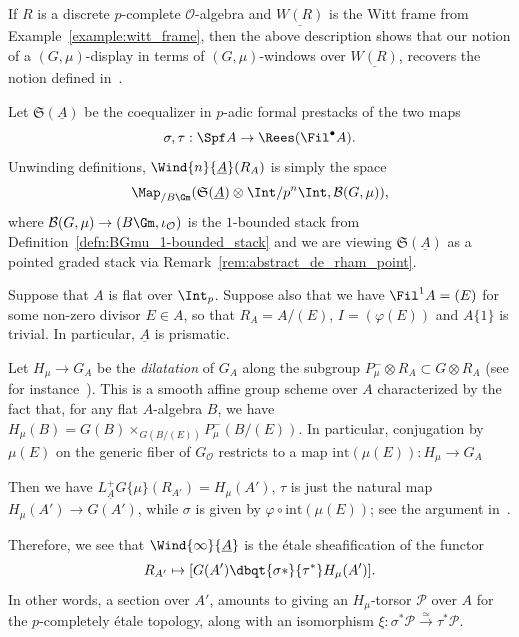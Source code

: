 \documentclass[10pt]{amsart}
\begin{document}
\begin{remark}
\label{rem:witt_frame_windows}
If $R$ is a discrete $p$-complete $\mathcal{O}$-algebra and $\underline{W(R)}$ is the Witt frame from Example~\ref{example:witt_frame}, then the above description shows that our notion of a $(G,\mu)$-display in terms of $(G,\mu)$-windows over $\underline{W(R)}$, recovers the notion defined in~\cite{MR4120808}.
\end{remark}   


\begin{remark}
\label{rem:B'Gmu_abstract}
Let $\mathfrak{S}(\underline{A})$ be the coequalizer in $p$-adic formal prestacks of the two maps
\[
\sigma,\tau:\Spf A \to \Rees(\Fil^\bullet A).
\]
Unwinding definitions, $\Wind{n}{\underline{A}}({R_A})$ is simply the space 
\[
\Map_{/B\Gm}(\mathfrak{S}(\underline{A})\otimes\Int/p^n\Int,\mathcal{B}(G,\mu)),
\]
where $\mathcal{B}(G,\mu)\to (B\Gm,\iota_{\mathcal{O}})$ is the $1$-bounded stack from Definition~\ref{defn:BGmu_1-bounded_stack} and we are viewing $\mathfrak{S}(\underline{A})$ as a pointed graded stack via Remark~\ref{rem:abstract_de_rham_point}.
\end{remark} 


\begin{remark}
\label{rem:dilatations}
Suppose that $A$ is flat over $\Int_p$. Suppose also that we have $\Fil^1A = (E)$ for some non-zero divisor $E\in A$, so that $R_A = A/(E)$, $I = (\varphi(E))$ and $A\{1\}$ is trivial. In particular, $\underline{A}$ is prismatic.

Let $H_{\mu}\to G_{A}$ be the \emph{dilatation} of $G_{A}$ along the subgroup $P^-_\mu\otimes R_A \subset G\otimes R_A$ (see for instance~\cite[\S 3.2]{blr}). This is a smooth affine group scheme over $A$ characterized by the fact that, for any flat $A$-algebra $B$, we have $H_\mu(B) = G(B)\times_{G(B/(E))}P^-_\mu(B/(E))$. In particular, conjugation by $\mu(E)$ on the generic fiber of $G_{\mathcal{O}}$ restricts to a map $\mathrm{int}(\mu(E)):H_\mu\to G_{A}$

Then we have $L^+_{\underline{A}}G\{\mu\}(R_{A'}) = H_\mu(A')$, $\tau$ is just the natural map $H_\mu(A')\to G(A')$, while $\sigma$ is given by $\varphi\circ \mathrm{int}(\mu(E))$; see the argument in~\cite[Lemma 5.2.1]{MR4355476}.

Therefore, we see that $\Wind{\infty}{\underline{A}}$ is the \'etale sheafification of the functor
\[
R_{A'}\mapsto [G(A')\dbqt{\sigma*}{\tau^*}H_\mu(A')].
\]
In other words, a section over $A'$, amounts to giving an $H_\mu$-torsor $\mathcal{P}$ over $A$ for the $p$-completely \'etale topology, along with an isomorphism $\xi:\sigma^* \mathcal{P}\xrightarrow{\simeq} \tau^* \mathcal{P}$. 
\end{remark}
\end{document}
